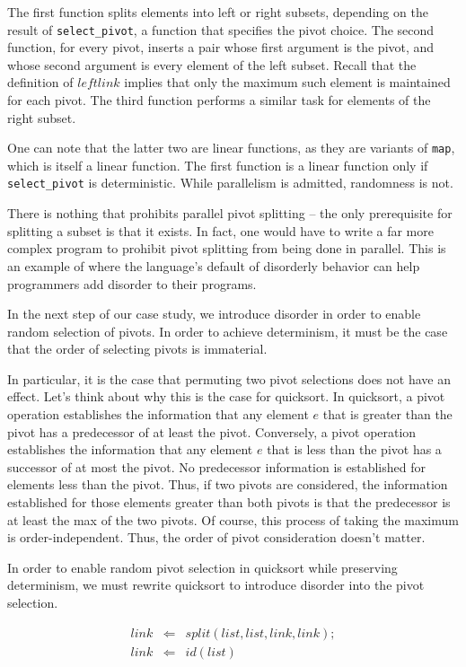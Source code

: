 The first function splits elements into left or right subsets, depending on the result of {\tt select\_pivot}, a function that specifies the pivot choice.  The second function, for every pivot, inserts a pair whose first argument is the pivot, and whose second argument is every element of the left subset.  Recall that the definition of $leftlink$ implies that only the maximum such element is maintained for each pivot.  The third function performs a similar task for elements of the right subset.

One can note that the latter two are linear functions, as they are variants of {\tt map}, which is itself a linear function.  The first function is a linear function only if {\tt select\_pivot} is deterministic.  While parallelism is admitted, randomness is not.

There is nothing that prohibits parallel pivot splitting -- the only prerequisite for splitting a subset is that it exists.  In fact, one would have to write a far more complex program to prohibit pivot splitting from being done in parallel.  This is an example of where the language's default of disorderly behavior can help programmers add disorder to their programs.

In the next step of our case study, we introduce disorder in order to enable random selection of pivots.  In order to achieve determinism, it must be the case that the order of selecting pivots is immaterial.

In particular, it is the case that permuting two pivot selections does not have an effect.  Let's think about why this is the case for quicksort. In quicksort, a pivot operation establishes the information that any element $e$ that is greater than the pivot has a predecessor of at least the pivot.  Conversely, a pivot operation establishes the information that any element $e$ that is less than the pivot has a successor of at most the pivot.  No predecessor information is established for elements less than the pivot.  Thus, if two pivots are considered, the information established for those elements greater than both pivots is that the predecessor is at least the max of the two pivots.  Of course, this process of taking the maximum is order-independent.  Thus, the order of pivot consideration doesn't matter.

In order to enable random pivot selection in quicksort while preserving determinism, we must rewrite quicksort to introduce disorder into the pivot selection.

\begin{eqnarray*}
link &\Leftarrow& split(list, list, link, link); \\
link &\Leftarrow& id(list)
\end{eqnarray*}

